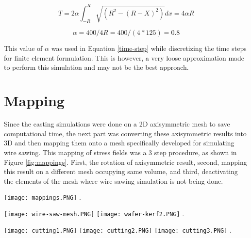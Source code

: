 \[ T = 2\alpha \int_{-R}^{R} \sqrt{(R^{2}-(R-X)^{2})}dx = 4\alpha R \]

\[ \alpha = 400/4R = 400/(4*125) = 0.8 \]

This value of $\alpha$ was used in Equation \ref{time-step} while discretizing the time steps for finite element formulation. This is however, a very loose approximation made to perform this simulation and may not be the best approach. 


\section{Mapping}

Since the casting simulations were done on a 2D axisymmetric mesh to save computational time, the next part was converting these axisymmetric results into 3D and then mapping them onto a mesh specifically developed for simulating wire sawing. This mapping of stress fields was a 3 step procedure, as shown in Figure \ref{fig:mappings}. First, the rotation of axisymmetric result, second, mapping this result on a different mesh occupying same volume, and third, deactivating the elements of the mesh where wire sawing simulation is not being done.

\noindent
\begin{minipage}[c]{\textwidth}
\centering
        \captionsetup{type=figure}
        \texttt{[image: mappings.PNG]}
        .
        \label{fig:mappings}
 \end{minipage}


\begin{minipage}[c]{\textwidth}
\centering
        \captionsetup{type=figure}
        \texttt{[image: wire-saw-mesh.PNG]}
        \texttt{[image: wafer-kerf2.PNG]}
        .
        \label{fig:model_change}
 \end{minipage}


\begin{minipage}[c]{\textwidth}
\centering
         \captionsetup{type=figure}
        \texttt{[image: cutting1.PNG]}
        \texttt{[image: cutting2.PNG]}
        \texttt{[image: cutting3.PNG]}
        .
        \label{fig:cutting}
 \end{minipage}


